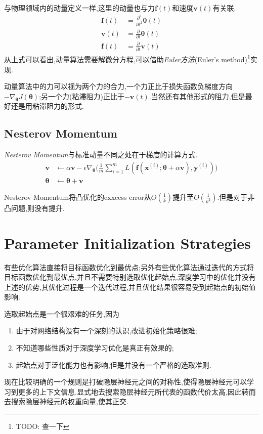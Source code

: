 与物理领域内的动量定义一样,这里的动量也与力$\bm f(t)$和速度$\bm v(t)$有关联.
\begin{equation}\begin{split}
\bm f(t)&=\frac{\partial^2}{\partial t^2}\bm\theta(t)\\
\bm v(t)&=\frac{\partial}{\partial t}\bm\theta(t)\\
\bm f(t)&=\frac{\partial}{\partial t}\bm v(t)
\end{split}\end{equation}
从上式可以看出,动量算法需要解微分方程,可以借助\textit{Euler方法}(Euler's method)\footnote{TODO: 查一下}实现.

动量算法中的力可以视为两个力的合力,一个力正比于损失函数负梯度方向$-\nabla_{\bm\theta} J(\bm\theta)$;另一个力(粘滞阻力)正比于$-\bm v(t)$.当然还有其他形式的阻力,但是最好还是用粘滞阻力的形式.

\subsection{Nesterov Momentum}

\textit{Nesterov Momentum}与标准动量不同之处在于梯度的计算方式.
\begin{equation}\begin{split}
\bm v&\leftarrow\alpha\bm v-\epsilon\nabla_{\bm\theta}\Big(\frac{1}{m}\sum_{i=1}^mL(\bm f(\bm x^{(i)};\bm\theta+\alpha\bm v),\bm y^{(i)})\Big)\\
\bm\theta&\leftarrow\bm\theta+\bm v
\end{split}\end{equation}

Nesterov Momentum将凸优化的exxcess error从$O(\frac{1}{k})$提升至$O(\frac{1}{k^2})$.但是对于非凸问题,则没有提升.

\section{Parameter Initialization Strategies}

有些优化算法直接将目标函数优化到最优点;另外有些优化算法通过迭代的方式将目标函数优化到最优点,并且不需要特别选取优化起始点.深度学习中的优化并没有上述的优势,其优化过程是一个迭代过程,并且优化结果很容易受到起始点的初始值影响.

选取起始点是一个很艰难的任务,因为
\begin{enumerate}
    \item 由于对网络结构没有一个深刻的认识,改进初始化策略很难;
    \item 不知道哪些性质对于深度学习优化是真正有效果的;
    \item 起始点对于泛化能力也有影响,但是并没有一个严格的选取准则.
\end{enumerate}
现在比较明确的一个规则是打破隐层神经元之间的对称性,使得隐层神经元可以学习到更多的上下文信息.显式地去搜索隐层神经元所代表的函数代价太高,因此转而去搜索隐层神经元的权重向量,使其正交.


